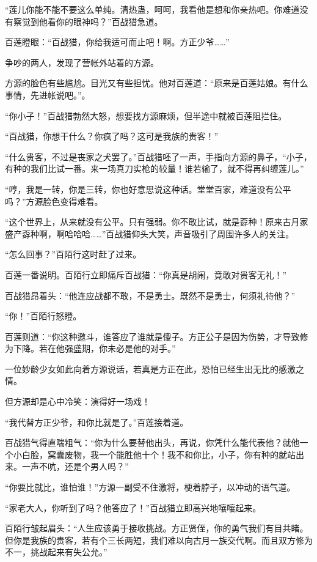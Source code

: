 \begin{this_body}
“莲儿你能不能不要这么单纯。清热蛊，呵呵，我看他是想和你亲热吧。你难道没有察觉到他看你的眼神吗？”百战猎急道。

百莲瞪眼：“百战猎，你给我适可而止吧！啊。方正少爷……”

争吵的两人，发现了营帐外站着的方源。

方源的脸色有些尴尬。目光又有些担忧。他对百莲道：“原来是百莲姑娘。有什么事情，先进帐说吧。”。

“你小子！”百战猎勃然大怒，想要找方源麻烦，但半途中就被百莲阻拦住。

“百战猎，你想干什么？你疯了吗？这可是我族的贵客！”

“什么贵客，不过是丧家之犬罢了。”百战猎呸了一声，手指向方源的鼻子，“小子，有种的我们比试一番。来一场真刀实枪的较量！谁若输了，就不得再纠缠莲儿。”

“哼，我是一转，你是三转，你也好意思说这种话。堂堂百家，难道没有公平吗？”方源脸色变得难看。

“这个世界上，从来就没有公平。只有强弱。你不敢比试，就是孬种！原来古月家盛产孬种啊，啊哈哈哈……”百战猎仰头大笑，声音吸引了周围许多人的关注。

“怎么回事？”百陌行这时赶了过来。

百莲一番说明。百陌行立即痛斥百战猎：“你真是胡闹，竟敢对贵客无礼！”

百战猎昂着头：“他连应战都不敢，不是勇士。既然不是勇士，何须礼待他？”

“你！”百陌行怒瞪。

百莲则道：“你这种邀斗，谁答应了谁就是傻子。方正公子是因为伤势，才导致修为下降。若在他强盛期，你未必是他的对手。”

一位妙龄少女如此向着方源说话，若真是方正在此，恐怕已经生出无比的感激之情。

但方源却是心中冷笑：演得好一场戏！

“我代替方正少爷，和你比就是了。”百莲接着道。

百战猎气得直喘粗气：“你为什么要替他出头，再说，你凭什么能代表他？就他一个小白脸，窝囊废物，我一个能胜他十个！我不和你比，小子，你有种的就站出来。一声不吭，还是个男人吗？”

“你要比就比，谁怕谁！”方源一副受不住激将，梗着脖子，以冲动的语气道。

“家老大人，你听到了吗？他答应了！”百战猎立即高兴地嚷嚷起来。

百陌行皱起眉头：“人生应该勇于接收挑战。方正贤侄，你的勇气我们有目共睹。但你是我族的贵客，若有个三长两短，我们难以向古月一族交代啊。而且双方修为不一，挑战起来有失公允。”


\end{this_body}
